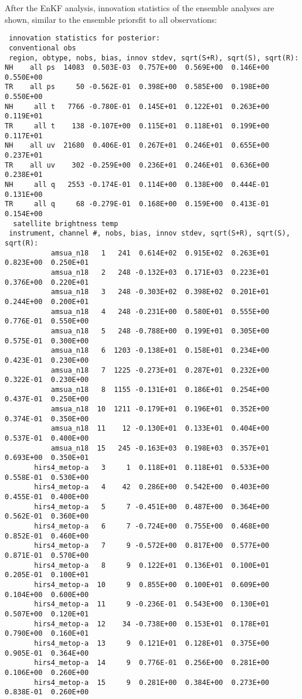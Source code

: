 After the EnKF analysis, innovation statistics of the ensemble analyses are shown, similar to the ensemble priors\textquotesingle  fit to all observations:
\begin{scriptsize}
\begin{verbatim}
 innovation statistics for posterior:
 conventional obs
 region, obtype, nobs, bias, innov stdev, sqrt(S+R), sqrt(S), sqrt(R):
NH    all ps  14083  0.503E-03  0.757E+00  0.569E+00  0.146E+00  0.550E+00
TR    all ps     50 -0.562E-01  0.398E+00  0.585E+00  0.198E+00  0.550E+00
NH     all t   7766 -0.780E-01  0.145E+01  0.122E+01  0.263E+00  0.119E+01
TR     all t    138 -0.107E+00  0.115E+01  0.118E+01  0.199E+00  0.117E+01
NH    all uv  21680  0.406E-01  0.267E+01  0.246E+01  0.655E+00  0.237E+01
TR    all uv    302 -0.259E+00  0.236E+01  0.246E+01  0.636E+00  0.238E+01
NH     all q   2553 -0.174E-01  0.114E+00  0.138E+00  0.444E-01  0.131E+00
TR     all q     68 -0.279E-01  0.168E+00  0.159E+00  0.413E-01  0.154E+00
  satellite brightness temp
 instrument, channel #, nobs, bias, innov stdev, sqrt(S+R), sqrt(S), sqrt(R):
           amsua_n18   1   241  0.614E+02  0.915E+02  0.263E+01  0.823E+00  0.250E+01
           amsua_n18   2   248 -0.132E+03  0.171E+03  0.223E+01  0.376E+00  0.220E+01
           amsua_n18   3   248 -0.303E+02  0.398E+02  0.201E+01  0.244E+00  0.200E+01
           amsua_n18   4   248 -0.231E+00  0.580E+01  0.555E+00  0.776E-01  0.550E+00
           amsua_n18   5   248 -0.788E+00  0.199E+01  0.305E+00  0.575E-01  0.300E+00
           amsua_n18   6  1203 -0.138E+01  0.158E+01  0.234E+00  0.423E-01  0.230E+00
           amsua_n18   7  1225 -0.273E+01  0.287E+01  0.232E+00  0.322E-01  0.230E+00
           amsua_n18   8  1155 -0.131E+01  0.186E+01  0.254E+00  0.437E-01  0.250E+00
           amsua_n18  10  1211 -0.179E+01  0.196E+01  0.352E+00  0.374E-01  0.350E+00
           amsua_n18  11    12 -0.130E+01  0.133E+01  0.404E+00  0.537E-01  0.400E+00
           amsua_n18  15   245 -0.163E+03  0.198E+03  0.357E+01  0.693E+00  0.350E+01
       hirs4_metop-a   3     1  0.118E+01  0.118E+01  0.533E+00  0.558E-01  0.530E+00
       hirs4_metop-a   4    42  0.286E+00  0.542E+00  0.403E+00  0.455E-01  0.400E+00
       hirs4_metop-a   5     7 -0.451E+00  0.487E+00  0.364E+00  0.562E-01  0.360E+00
       hirs4_metop-a   6     7 -0.724E+00  0.755E+00  0.468E+00  0.852E-01  0.460E+00
       hirs4_metop-a   7     9 -0.572E+00  0.817E+00  0.577E+00  0.871E-01  0.570E+00
       hirs4_metop-a   8     9  0.122E+01  0.136E+01  0.100E+01  0.205E-01  0.100E+01
       hirs4_metop-a  10     9  0.855E+00  0.100E+01  0.609E+00  0.104E+00  0.600E+00
       hirs4_metop-a  11     9 -0.236E-01  0.543E+00  0.130E+01  0.507E+00  0.120E+01
       hirs4_metop-a  12    34 -0.738E+00  0.153E+01  0.178E+01  0.790E+00  0.160E+01
       hirs4_metop-a  13     9  0.121E+01  0.128E+01  0.375E+00  0.905E-01  0.364E+00
       hirs4_metop-a  14     9  0.776E-01  0.256E+00  0.281E+00  0.106E+00  0.260E+00
       hirs4_metop-a  15     9  0.281E+00  0.384E+00  0.273E+00  0.838E-01  0.260E+00
\end{verbatim}
\end{scriptsize}

